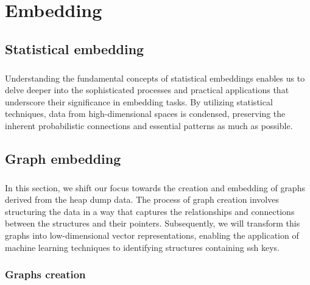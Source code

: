 \chapter{Embedding}\label{chap:embedding}

\section{Statistical embedding}
    \paragraph{}Understanding the fundamental concepts of statistical embeddings enables us to delve deeper into the sophisticated processes and practical applications that underscore their significance in embedding tasks. By utilizing statistical techniques, data from high-dimensional spaces is condensed, preserving the inherent probabilistic connections and essential patterns as much as possible.
    

\section{Graph embedding}\label{sec:embedding:graph_embedding}
    \paragraph{}In this section, we shift our focus towards the creation and embedding of graphs derived from the heap dump data. The process of graph creation involves structuring the data in a way that captures the relationships and connections between the \glspl{structure} and their \glspl{pointer}. Subsequently, we will transform this graphs into low-dimensional vector representations, enabling the application of machine learning techniques to identifying \glspl{structure} containing ssh keys.

    \subsection{Graphs creation}
